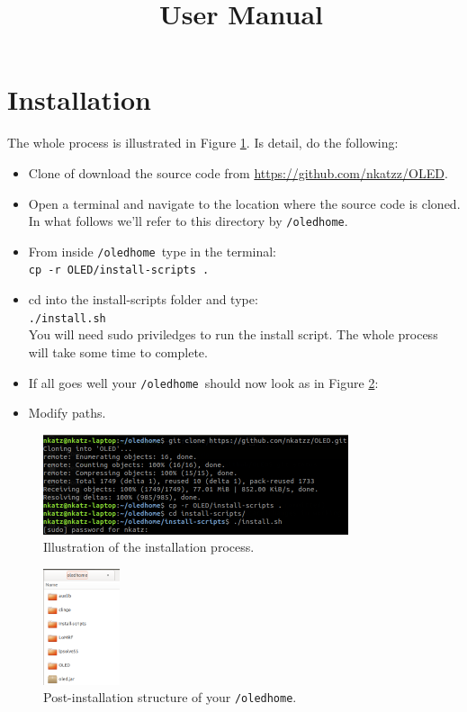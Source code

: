 \documentclass[12pt]{article}
\title{\oled \  User Manual}
\newcommand{\home}{\texttt{/oledhome}}
\begin{document}
\maketitle

\section{Installation}
The whole process is illustrated in Figure \ref{fig:terminal}. Is detail, do the following:
\begin{itemize}
\item Clone of download the source code from \url{https://github.com/nkatzz/OLED}. 
\item Open a terminal and navigate to the location where the source code is cloned. In what follows we'll refer to this directory by \home.
\item From inside \home \ type in the terminal: \\ \texttt{cp -r OLED/install-scripts .}
\item cd into the install-scripts folder and type:\\
\texttt{./install.sh}\\
You will need sudo priviledges to run the install script. The whole process will take some time to complete.
\item If all goes well your \home \ should now look as in Figure \ref{fig:install}:

\item Modify paths.

\end{itemize}


\begin{figure}[h]
\centering
\includegraphics[width=0.8\textwidth]{./figures/install}
\caption{Illustration of the installation process.}%
\label{fig:terminal}
\end{figure}

 

\begin{figure}[h]
\centering
\includegraphics[width=0.2\textwidth]{./figures/oledhome-2}
\caption{Post-installation structure of your \home.}%
\label{fig:install}
\end{figure}
\end{document}
